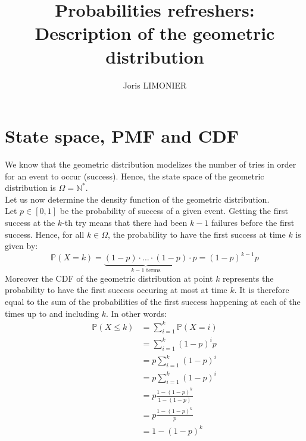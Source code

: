\documentclass{article}
\title{Probabilities refreshers:\\Description of the geometric distribution}
\author{Joris LIMONIER}
\renewcommand{\P}{\mathbb{P}}
\begin{document}
\maketitle

\section{State space, PMF and CDF}
We know that the geometric distribution modelizes the number of tries in order for an event to occur (success). Hence, the state space of the geometric distribution is \(\Omega = \mathbb{N}^*\).\\
Let us now determine the density function of the geometric distribution.\\
Let \(p \in [0,1]\) be the probability of success of a given event. Getting the first success at the \(k\)-th try means that there had been \(k-1\) failures before the first success. Hence, for all \(k \in \Omega\), the probability to have the first success at time \(k\) is given by:
\[
    \P(X = k) = \underbrace{(1-p) \cdot \ldots \cdot (1-p)}_{k-1 \text{ terms}} \cdot p = (1-p)^{k-1} p
\]
Moreover the CDF of the geometric distribution at point \(k\) represents the probability to have the first success occuring at most at time \(k\). It is therefore equal to the sum of the probabilities of the first success happening at each of the times up to and including \(k\). In other words:
\begin{align*}
    \P(X \leq k)
     & = \sum_{i=1}^{k} \P (X = i)           \\
     & = \sum_{i=1}^{k} (1-p)^{i} p          \\
     & = p \sum_{i=1}^{k} (1-p)^{i}          \\
     & = p \sum_{i=1}^{k} (1-p)^{i}          \\
     & = p \frac{1 - (1 - p)^{k}}{1 - (1-p)} \\
     & = p \frac{1 - (1 - p)^{k}}{p}         \\
     & = 1 - (1 - p)^{k}                     \\
\end{align*}
\end{document}
